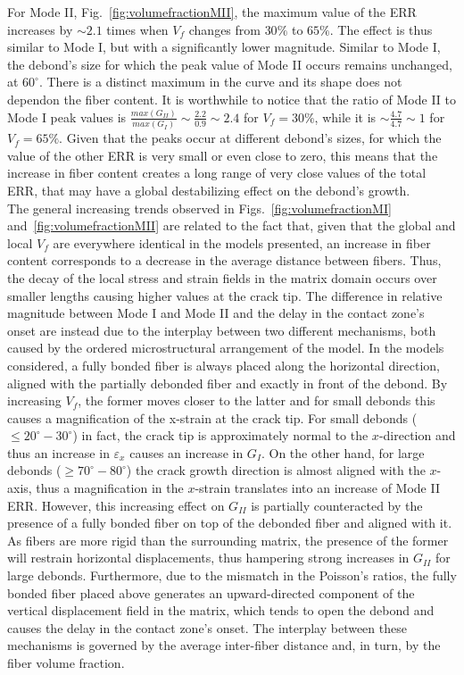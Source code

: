 \documentclass[review]{elsarticle}
\begin{document}
For Mode II, Fig.~\ref{fig:volumefractionMII}, the maximum value of the ERR increases by $\sim 2.1$ times when $V_{f}$ changes from $30\%$ to $65\%$. The effect is thus similar to Mode I, but with a significantly lower magnitude. Similar to Mode I, the debond's size for which the peak value of Mode II occurs remains unchanged, at $60^{\circ}$. There is a distinct maximum in the curve and its shape does not dependon the fiber content. It is worthwhile to notice that the ratio of Mode II to Mode I peak values is $\frac{max\left(G_{II}\right)}{max\left(G_{I}\right)}\sim\frac{2.2}{0.9}\sim 2.4$ for $V_{f}=30\%$, while it is $\sim\frac{4.7}{4.7}\sim 1$ for $V_{f}=65\%$. Given that the peaks occur at different debond's sizes, for which the value of the other ERR is very small or even close to zero, this means that the increase in fiber content creates a long range of very close values of the total ERR, that may have a global destabilizing effect on the debond's growth.\\
The general increasing trends observed in Figs.~\ref{fig:volumefractionMI} and~\ref{fig:volumefractionMII} are related to the fact that, given that the global and local $V_{f}$ are everywhere identical in the models presented, an increase in fiber content corresponds to a decrease in the average distance between fibers. Thus, the decay of the local stress and strain fields in the matrix domain occurs over smaller lengths causing higher values at the crack tip. The difference in relative magnitude between Mode I and Mode II and the delay in the contact zone's onset are instead due to the interplay between two different mechanisms, both caused by the ordered microstructural arrangement of the model. In the models considered, a fully bonded fiber is always placed along the horizontal direction, aligned with the partially debonded fiber and exactly in front of the debond. By increasing $V_{f}$, the former moves closer to the latter and for small debonds this causes a magnification of the x-strain at the crack tip. For small debonds ($\leq 20^{\circ}-30^{\circ}$) in fact, the crack tip is approximately normal to the $x$-direction and thus an increase in $\varepsilon_{x}$ causes an increase in $G_{I}$. On the other hand, for large debonds ($\geq 70^{\circ}-80^{\circ}$) the crack growth direction is almost aligned with the $x$-axis, thus a magnification in the $x$-strain translates into an increase of Mode II ERR. However, this increasing effect on $G_{II}$ is partially counteracted by the presence of a fully bonded fiber on top of the debonded fiber and aligned with it. As fibers are more rigid than the surrounding matrix, the presence of the former will restrain horizontal displacements, thus hampering strong increases in $G_{II}$ for large debonds. Furthermore, due to the mismatch in the Poisson's ratios, the fully bonded fiber placed above generates an upward-directed component of the vertical displacement field in the matrix, which tends to open the debond and causes the delay in the contact zone's onset. The interplay between these mechanisms is governed by the average inter-fiber distance and, in turn, by the fiber volume fraction.\\
\end{document}
